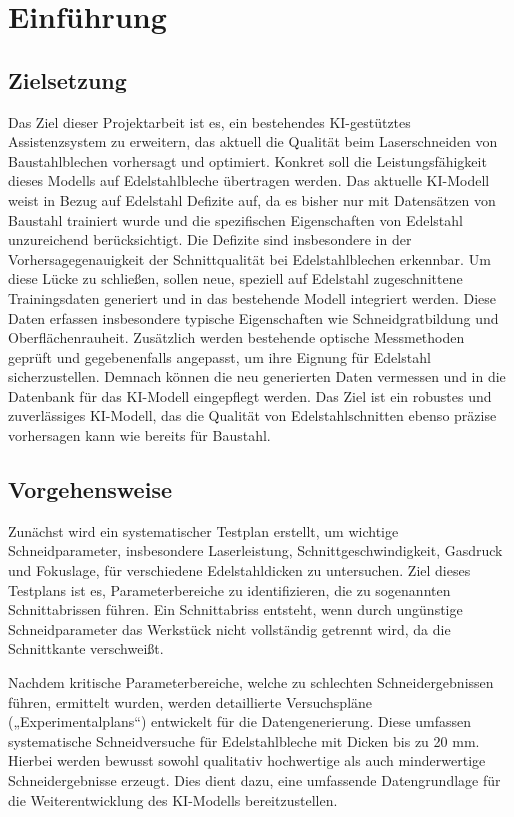 \chapter{Einführung}
\section{Zielsetzung}
Das Ziel dieser Projektarbeit ist es, ein bestehendes KI-gestütztes Assistenzsystem zu erweitern, das aktuell die Qualität beim Laserschneiden von Baustahlblechen vorhersagt und optimiert. Konkret soll die Leistungsfähigkeit dieses Modells auf Edelstahlbleche übertragen werden. Das aktuelle KI-Modell weist in Bezug auf Edelstahl Defizite auf, da es bisher nur mit Datensätzen von Baustahl trainiert wurde und die spezifischen Eigenschaften von Edelstahl unzureichend berücksichtigt. Die Defizite sind insbesondere in der Vorhersagegenauigkeit der Schnittqualität bei Edelstahlblechen erkennbar.
Um diese Lücke zu schließen, sollen neue, speziell auf Edelstahl zugeschnittene Trainingsdaten generiert und in das bestehende Modell integriert werden. Diese Daten erfassen insbesondere typische Eigenschaften wie Schneidgratbildung und Oberflächenrauheit. Zusätzlich werden bestehende optische Messmethoden geprüft und gegebenenfalls angepasst, um ihre Eignung für Edelstahl sicherzustellen. Demnach können die neu generierten Daten vermessen und in die Datenbank für das KI-Modell eingepflegt werden. Das Ziel ist ein robustes und zuverlässiges KI-Modell, das die Qualität von Edelstahlschnitten ebenso präzise vorhersagen kann wie bereits für Baustahl.

\section{Vorgehensweise}
Zunächst wird ein systematischer Testplan erstellt, um wichtige Schneidparameter, insbesondere Laserleistung, Schnittgeschwindigkeit, Gasdruck und Fokuslage, für verschiedene Edelstahldicken zu untersuchen. Ziel dieses Testplans ist es, Parameterbereiche zu identifizieren, die zu sogenannten Schnittabrissen führen. Ein Schnittabriss entsteht, wenn durch ungünstige Schneidparameter das Werkstück nicht vollständig getrennt wird, da die Schnittkante verschweißt.

Nachdem kritische Parameterbereiche, welche zu schlechten Schneidergebnissen führen, ermittelt wurden, werden detaillierte Versuchspläne („Experimentalplans“) entwickelt für die Datengenerierung. Diese umfassen systematische Schneidversuche für Edelstahlbleche mit Dicken bis zu 20 mm. Hierbei werden bewusst sowohl qualitativ hochwertige als auch minderwertige Schneidergebnisse erzeugt. Dies dient dazu, eine umfassende Datengrundlage für die Weiterentwicklung des KI-Modells bereitzustellen.

